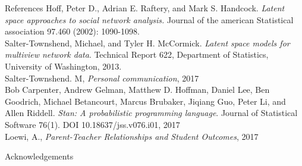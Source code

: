 \documentclass[final]{beamer}
\newlength{\onecolwid}
\begin{document}
\begin{frame}[t]
\begin{columns}[t]
\begin{column}{\onecolwid}
\begin{block}{References}
Hoff, Peter D., Adrian E. Raftery, and Mark S. Handcock. \textit{Latent space approaches to social network analysis.} Journal of the american Statistical association 97.460 (2002): 1090-1098.\\
Salter-Townshend, Michael, and Tyler H. McCormick. \textit{Latent space models for multiview network data}. Technical Report 622, Department of Statistics, University of Washington, 2013.\\
Salter-Townshend. M, \textit{Personal communication}, 2017\\
Bob Carpenter, Andrew Gelman, Matthew D. Hoffman, Daniel Lee, Ben Goodrich, Michael Betancourt, Marcus Brubaker, Jiqiang Guo, Peter Li, and Allen Riddell. \textit{Stan: A probabilistic programming language}. Journal of Statistical Software 76(1). DOI 10.18637/jss.v076.i01, 2017\\
Loewi, A., \textit{Parent-Teacher Relationships and Student Outcomes}, 2017


 \end{block}



\begin{block}{Acknowledgements}

  {\small{}}

\end{block}




\end{column}
\end{columns}
\end{frame}
\end{document}
